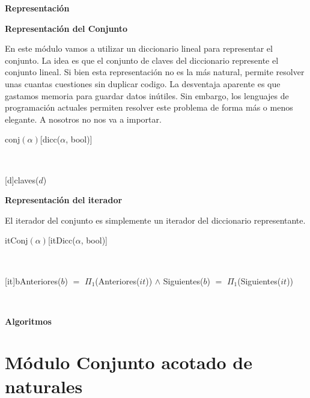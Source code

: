 \documentclass[a4paper,10pt]{article}
\newenvironment{Representacion}{%
  \vspace*{2ex}%
  \noindent\textbf{\Large Representación}%
  \vspace*{2ex}%
}{}
\newenvironment{Algoritmos}{%
  \vspace*{2ex}%
  \noindent\textbf{\Large Algoritmos}%
  \vspace*{2ex}%
}{}
\newcommand{\Titulo}[1]{
  \vspace*{1ex}\par\noindent\textbf{\large #1}\par
}
\begin{document}
\begin{Representacion}
  
  \Titulo{Representación del Conjunto}

  En este módulo vamos a utilizar un diccionario lineal para representar el conjunto.  La idea es que el conjunto de claves del diccionario represente el conjunto lineal.  Si bien esta representación no es la más natural, permite resolver unas cuantas cuestiones sin duplicar codigo.  La desventaja aparente es que gastamos memoria para guardar datos inútiles.  Sin embargo, los lenguajes de programación actuales permiten resolver este problema de forma más o menos elegante.  A nosotros no nos va a importar.

  \begin{Estructura}{conj$(\alpha)$}[dicc($\alpha$, bool)]
  \end{Estructura}


  ~

  [d]{claves($d$)}

  \Titulo{Representación del iterador}

  El iterador del conjunto es simplemente un iterador del diccionario representante.

  \begin{Estructura}{itConj$(\alpha)$}[itDicc($\alpha$, bool)]
  \end{Estructura}


  ~

  [it]{b}{Anteriores($b$) $=$ $\Pi_1$(Anteriores($it$)) $\land$ Siguientes($b$) $=$ $\Pi_1$(Siguientes($it$))}\mbox{}

  ~


\end{Representacion}

\begin{Algoritmos}
  
\end{Algoritmos}



\section{Módulo Conjunto acotado de naturales}
\end{document}
